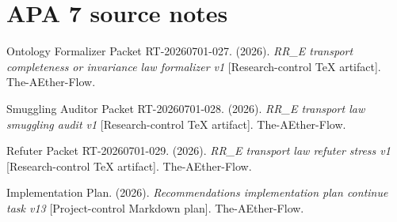 \documentclass[11pt]{article}
\begin{document}
\section{APA 7 source notes}

Ontology Formalizer Packet RT-20260701-027. (2026). \emph{RR\_E transport
completeness or invariance law formalizer v1} [Research-control TeX artifact].
The-AEther-Flow.

Smuggling Auditor Packet RT-20260701-028. (2026). \emph{RR\_E transport law
smuggling audit v1} [Research-control TeX artifact]. The-AEther-Flow.

Refuter Packet RT-20260701-029. (2026). \emph{RR\_E transport law refuter
stress v1} [Research-control TeX artifact]. The-AEther-Flow.

Implementation Plan. (2026). \emph{Recommendations implementation plan continue
task v13} [Project-control Markdown plan]. The-AEther-Flow.
\end{document}
